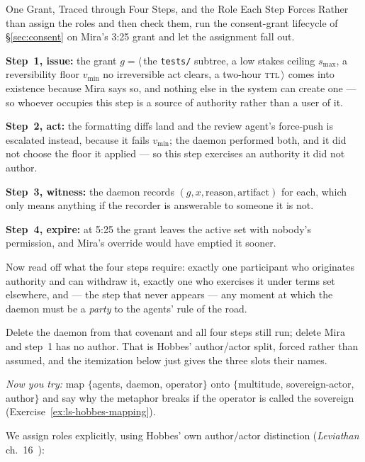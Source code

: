 \documentclass[11pt,a4paper]{article}
\theoremstyle{definition}
\theoremstyle{plain}
\begin{document}
\begin{pdexample}{One Grant, Traced through Four Steps, and the Role Each Step Forces}
\setlength{\parskip}{4pt plus 1pt}
Rather than assign the roles and then check them, run the consent-grant lifecycle of \S\ref{sec:consent} on Mira's 3:25 grant and let the assignment fall out.

\textbf{Step~1, issue:} the grant $g = \langle$\,the \texttt{tests/} subtree, a low stakes ceiling $s_{\max}$, a reversibility floor $v_{\min}$ no irreversible act clears, a two-hour \textsc{ttl}\,$\rangle$ comes into existence because Mira says so, and nothing else in the system can create one --- so whoever occupies this step is a source of authority rather than a user of it.

\textbf{Step~2, act:} the formatting diffs land and the review agent's force-push is escalated instead, because it fails $v_{\min}$; the daemon performed both, and it did not choose the floor it applied --- so this step exercises an authority it did not author.

\textbf{Step~3, witness:} the daemon records $(g, x, \text{reason}, \text{artifact})$ for each, which only means anything if the recorder is answerable to someone it is not.

\textbf{Step~4, expire:} at 5:25 the grant leaves the active set with nobody's permission, and Mira's override would have emptied it sooner.

Now read off what the four steps require: exactly one participant who originates authority and can withdraw it, exactly one who exercises it under terms set elsewhere, and --- the step that never appears --- any moment at which the daemon must be a \emph{party} to the agents' rule of the road.

Delete the daemon from that covenant and all four steps still run; delete Mira and step~1 has no author. That is Hobbes' author/actor split, forced rather than assumed, and the itemization below just gives the three slots their names.

\emph{Now you try:} map $\{$agents, daemon, operator$\}$ onto $\{$multitude, sovereign-actor, author$\}$ and say why the metaphor breaks if the operator is called the sovereign (Exercise~\ref{ex:ls-hobbes-mapping}).
\end{pdexample}

We assign roles explicitly, using Hobbes' own
author/actor distinction (\emph{Leviathan} ch.~16~):
\end{document}
